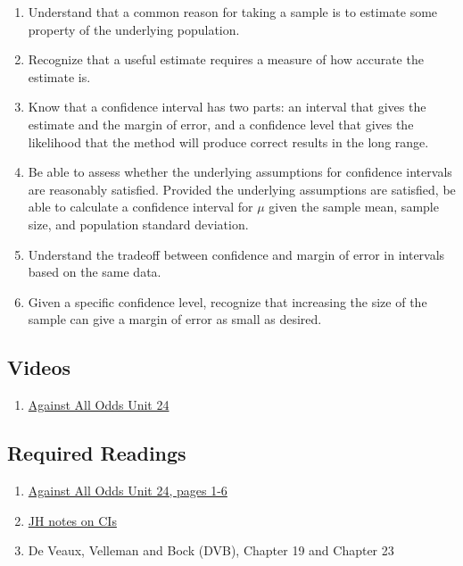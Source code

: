 \documentclass[letterpaper,9pt,twocolumn,twoside,printwatermark=false]{pinp}
\providecommand{\tightlist}{%
  \setlength{\itemsep}{0pt}\setlength{\parskip}{0pt}}
\begin{document}
\begin{enumerate}
\def\labelenumi{\arabic{enumi}.}
\tightlist
\item
  Understand that a common reason for taking a sample is to estimate
  some property of the underlying population.
\item
  Recognize that a useful estimate requires a measure of how accurate
  the estimate is.
\item
  Know that a confidence interval has two parts: an interval that gives
  the estimate and the margin of error, and a confidence level that
  gives the likelihood that the method will produce correct results in
  the long range.
\item
  Be able to assess whether the underlying assumptions for confidence
  intervals are reasonably satisfied. Provided the underlying
  assumptions are satisfied, be able to calculate a confidence interval
  for \(\mu\) given the sample mean, sample size, and population
  standard deviation.
\item
  Understand the tradeoff between confidence and margin of error in
  intervals based on the same data.
\item
  Given a specific confidence level, recognize that increasing the size
  of the sample can give a margin of error as small as desired.
\end{enumerate}

\hypertarget{videos}{%
\subsection{Videos}\label{videos}}

\begin{enumerate}
\def\labelenumi{\arabic{enumi}.}
\tightlist
\item
  \href{https://www.learner.org/courses/againstallodds/unitpages/unit24.html}{Against
  All Odds Unit 24}
\end{enumerate}

\hypertarget{required-readings-1}{%
\subsection{Required Readings}\label{required-readings-1}}

\begin{enumerate}
\item \href{https://www.learner.org/courses/againstallodds/pdfs/AgainstAllOdds_StudentGuide_Unit24.pdf#page=1}{Against All Odds Unit 24, pages 1-6}
\item \href{https://www.dropbox.com/s/epgqkz3g0qklcp9/Ch14ConfidenceIntervalsJH2018.pdf?dl=0}{JH notes on CIs}
\item De Veaux, Velleman and Bock (DVB), Chapter 19 and Chapter 23
\end{enumerate}





\end{document}
